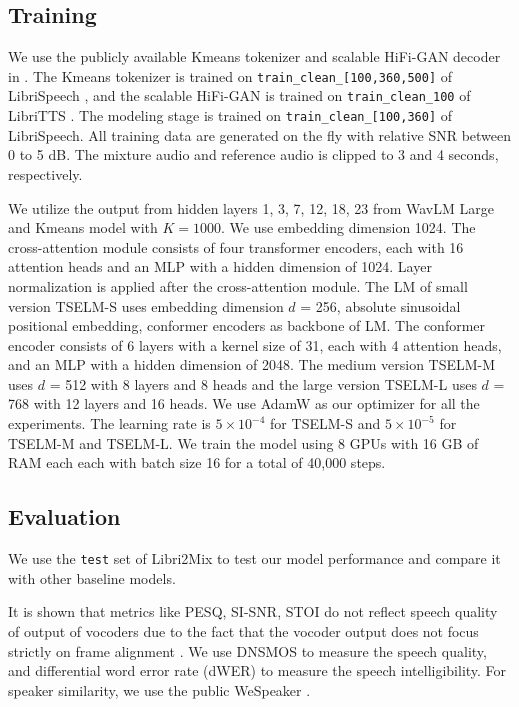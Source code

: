\documentclass[conference]{IEEEtran}
\begin{document}
\subsection{Training}

We use the publicly available Kmeans tokenizer and scalable 
HiFi-GAN decoder in \cite{speechbrain}. The Kmeans tokenizer
is trained on \texttt{train\_clean\_[100,360,500]} of
LibriSpeech \cite{librispeech}, and the scalable HiFi-GAN is trained on \texttt{train\_clean\_100} of 
LibriTTS \cite{libritts}. The modeling stage is trained on 
\texttt{train\_clean\_[100,360]} of LibriSpeech. All training data are 
generated on the fly with relative SNR between 0 to 5 dB. The mixture audio and reference audio is clipped to 3 and 4 seconds, respectively.

We utilize the output from hidden layers 1, 3, 7, 12, 18, 23 from WavLM Large and Kmeans model with 
\(K=1000\).
We use embedding dimension 1024.  The cross-attention module consists of four transformer encoders, each with 16 attention heads and an MLP with a hidden dimension of 1024. Layer normalization is applied after the cross-attention module.
The LM of small version TSELM-S uses 
embedding dimension \(d\) = 256, absolute sinusoidal positional embedding, conformer encoders as backbone of LM. The conformer encoder consists of 6 layers with a kernel size of 31, each with 4 attention heads, and an MLP with a hidden dimension of 2048. The medium version TSELM-M uses \(d\) = 512 with 8 layers and 8 heads and the large version TSELM-L uses 
\(d\) = 768 with 12 layers and 16 heads. We use AdamW as 
our optimizer for all the experiments. The learning rate 
is \(5 \times 10^{-4}\) for TSELM-S and \(5 \times 10^{-5}\) for TSELM-M and TSELM-L. We train the model using 8 GPUs with 16 GB of RAM each each with batch size 16 for a total of 40,000 steps.


\subsection{Evaluation}



We use the \texttt{test} set of Libri2Mix \cite{librimix} to test our model performance and compare it with 
other baseline models. 

It is shown that metrics like PESQ, SI-SNR, STOI do not reflect speech quality of output of 
vocoders due to the fact that the vocoder output does not focus strictly on frame alignment
\cite{tokensplit,selm}. We use DNSMOS \cite{dnsmos} to measure the speech quality, and differential 
word error 
rate (dWER) \cite{dwer} to measure the speech intelligibility. For speaker similarity, we use the 
public WeSpeaker \cite{wespeaker}.
\end{document}
